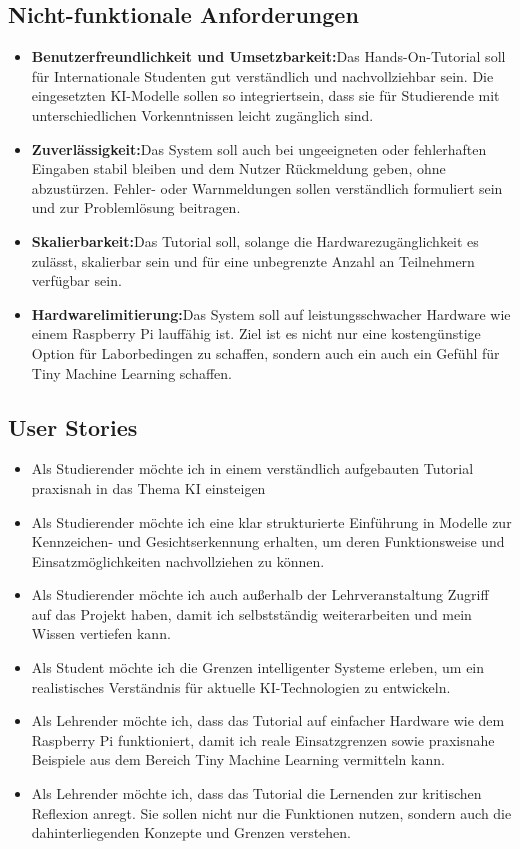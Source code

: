 \subsection{Nicht-funktionale Anforderungen}
\begin{itemize}
    \item \textbf{Benutzerfreundlichkeit und Umsetzbarkeit:}Das Hands-On-Tutorial soll für Internationale Studenten gut verständlich und nachvollziehbar sein. Die eingesetzten KI-Modelle sollen so integriertsein, dass sie für Studierende mit unterschiedlichen Vorkenntnissen leicht zugänglich sind. 
    \item \textbf{Zuverlässigkeit:}Das System soll auch bei ungeeigneten oder fehlerhaften Eingaben stabil bleiben und dem Nutzer Rückmeldung geben, ohne abzustürzen. Fehler- oder Warnmeldungen sollen verständlich formuliert sein und zur Problemlösung beitragen. 
    \item \textbf{Skalierbarkeit:}Das Tutorial soll, solange die Hardwarezugänglichkeit es zulässt, skalierbar sein und für eine unbegrenzte Anzahl an Teilnehmern verfügbar sein.  
    \item \textbf{Hardwarelimitierung:}Das System soll auf leistungsschwacher Hardware wie einem Raspberry Pi lauffähig ist. Ziel ist es nicht nur eine kostengünstige Option für Laborbedingen zu schaffen, sondern auch ein auch ein Gefühl für Tiny Machine Learning schaffen. 
\end{itemize}
\subsection{User Stories}
\begin{itemize}
    \item Als Studierender möchte ich in einem verständlich aufgebauten Tutorial praxisnah in das Thema KI einsteigen 
    \item Als Studierender möchte ich eine klar strukturierte Einführung in Modelle zur Kennzeichen- und Gesichtserkennung erhalten, um deren Funktionsweise und Einsatzmöglichkeiten nachvollziehen zu können. 
    \item Als Studierender möchte ich auch außerhalb der Lehrveranstaltung Zugriff auf das Projekt haben, damit ich selbstständig weiterarbeiten und mein Wissen vertiefen kann. 
    \item Als Student möchte ich die Grenzen intelligenter Systeme erleben, um ein realistisches Verständnis für aktuelle KI-Technologien zu entwickeln. 
    \item Als Lehrender möchte ich, dass das Tutorial auf einfacher Hardware wie dem Raspberry Pi funktioniert, damit ich reale Einsatzgrenzen sowie praxisnahe Beispiele aus dem Bereich Tiny Machine Learning vermitteln kann. 
    \item Als Lehrender möchte ich, dass das Tutorial die Lernenden zur kritischen Reflexion anregt. Sie sollen nicht nur die Funktionen nutzen, sondern auch die dahinterliegenden Konzepte und Grenzen verstehen. 
\end{itemize}